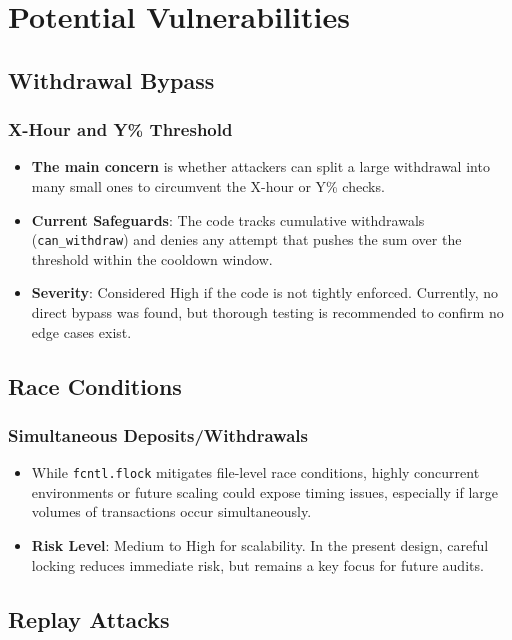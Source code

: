 \documentclass[11pt,a4paper]{article}
\begin{document}
\section{Potential Vulnerabilities}

\subsection{Withdrawal Bypass}

\subsubsection{X-Hour and Y\% Threshold}
\begin{itemize}
    \item \textbf{The main concern} is whether attackers can split a large withdrawal into many small ones to circumvent the X-hour or Y\% checks.
    \item \textbf{Current Safeguards}: The code tracks cumulative withdrawals (\texttt{can\_withdraw}) and denies any attempt that pushes the sum over the threshold within the cooldown window.
    \item \textbf{Severity}: Considered High if the code is not tightly enforced. Currently, no direct bypass was found, but thorough testing is recommended to confirm no edge cases exist.
\end{itemize}

\subsection{Race Conditions}

\subsubsection{Simultaneous Deposits/Withdrawals}
\begin{itemize}
    \item While \texttt{fcntl.flock} mitigates file-level race conditions, highly concurrent environments or future scaling could expose timing issues, especially if large volumes of transactions occur simultaneously.
    \item \textbf{Risk Level}: Medium to High for scalability. In the present design, careful locking reduces immediate risk, but remains a key focus for future audits.
\end{itemize}

\subsection{Replay Attacks}
\end{document}
